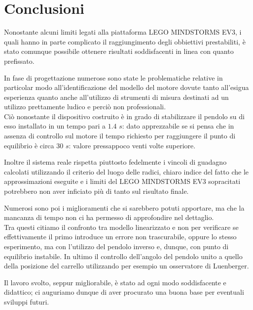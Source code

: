 \chapter{Conclusioni}
Nonostante alcuni limiti legati alla piattaforma LEGO MINDSTORMS EV3, i quali hanno in parte complicato il raggiungimento degli obbiettivi prestabiliti, è stato comunque possibile ottenere risultati soddisfacenti in linea con quanto prefissato.

In fase di progettazione numerose sono state le problematiche relative in particolar modo all'identificazione del modello del motore dovute tanto all'esigua esperienza quanto anche all'utilizzo di strumenti di misura destinati ad un utilizzo prettamente ludico e perciò non professionali.\\
Ciò nonostante il dispositivo costruito è in grado di stabilizzare il pendolo su di esso installato in un tempo pari a $1.4$ $s$: dato apprezzabile se si pensa che in assenza di controllo sul motore il tempo richiesto per raggiungere il punto di equilibrio è circa $30$ $s$: valore pressappoco venti volte superiore.

Inoltre il sistema reale rispetta piuttosto fedelmente i vincoli di guadagno calcolati utilizzando il criterio del luogo delle radici, chiaro indice del fatto che le approssimazioni eseguite e i limiti del LEGO MINDSTORMS EV3 sopracitati potrebbero non aver inficiato più di tanto sul risultato finale.

Numerosi sono poi i miglioramenti che si sarebbero potuti apportare, ma che la mancanza di tempo non ci ha permesso di approfondire nel dettaglio.\\
Tra questi citiamo il confronto tra modello linearizzato e non per verificare se effettivamente il primo introduce un errore non trascurabile, oppure lo stesso esperimento, ma con l'utilizzo del pendolo inverso e, dunque, con punto di equilibrio instabile. In ultimo il controllo dell'angolo del pendolo unito a quello della posizione del carrello utilizzando per esempio un osservatore di Luenberger.

Il lavoro svolto, seppur migliorabile, è stato ad ogni modo soddisfacente e didattico; ci auguriamo dunque di aver procurato una buona base per eventuali sviluppi futuri.



